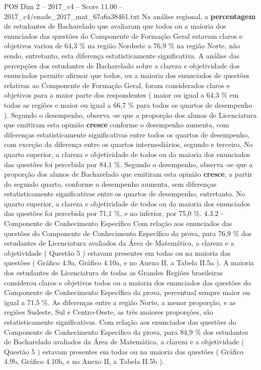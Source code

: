 \begin{textsample}{POS Dim 2 – 2017\_c4 – Score 11.00 – 2017\_c4/enade\_2017\_mat\_67a6a38461.txt}
Na análise regional, a \textbf{percentagem} de estudantes de Bacharelado que avaliaram que todos ou a maioria dos enunciados das questões do Componente de Formação Geral estavam claros e objetivos variou de 64,3 \% na região Nordeste a 76,9 \% na região Norte, não sendo, entretanto, esta diferença estatisticamente significativa.
A análise das percepções dos estudantes de Bacharelado sobre a clareza e objetividade dos enunciados permite afirmar que todos, ou a maioria dos enunciados de questões relativas ao Componente de Formação Geral, foram considerados claros e objetivos para a maior parte dos respondentes ( maior ou igual a 64,3 \% em todas as regiões e maior ou igual a 66,7 \% para todos os quartos de desempenho ).
Segundo o desempenho, observa -se que a proporção dos alunos de Licenciatura que emitiram esta opinião \textbf{cresce} conforme o desempenho aumenta, com diferenças estatisticamente significativas entre todos os quartos de desempenho, com exceção da diferença entre os quartos intermediários, segundo e terceiro.
No quarto superior, a clareza e objetividade de todos ou da maioria dos enunciados das questões foi percebida por 84,1 \%.
Segundo o desempenho, observa -se que a proporção dos alunos de Bacharelado que emitiram esta opinião \textbf{cresce}, a partir do segundo quarto, conforme o desempenho aumenta, sem diferenças estatisticamente significativas entre os quartos de desempenho, entretanto.
No quarto superior, a clareza e objetividade de todos ou da maioria dos enunciados das questões foi percebida por 71,1 \%, e no inferior, por 75,0 \%. 4.3.2 - Componente de Conhecimento Específico Com relação aos enunciados das questões do Componente de Conhecimento Específico da prova, para 76,9 \% dos estudantes de Licenciatura avaliados da Área de Matemática, a clareza e a objetividade ( Questão 5 ) estavam presentes em todas ou na maioria das questões ( Gráfico 4.9a, Gráfico 4.10a, e no Anexo II, a Tabela II.5a ).
A maioria dos estudantes de Licenciatura de todas as Grandes Regiões brasileiras considerou claros e objetivos todos ou a maioria dos enunciados das questões do Componente de Conhecimento Específico da prova, percentual sempre maior ou igual a 71,5 \%.
As diferenças entre a região Norte, a menor proporção, e as regiões Sudeste, Sul e Centro-Oeste, as três maiores proporções, são estatisticamente significativas.
Com relação aos enunciados das questões do Componente de Conhecimento Específico da prova, para 84,9 \% dos estudantes de Bacharelado avaliados da Área de Matemática, a clareza e a objetividade ( Questão 5 ) estavam presentes em todas ou na maioria das questões ( Gráfico 4.9b, Gráfico 4.10b, e no Anexo II, a Tabela II.5b ).

\end{textsample}
